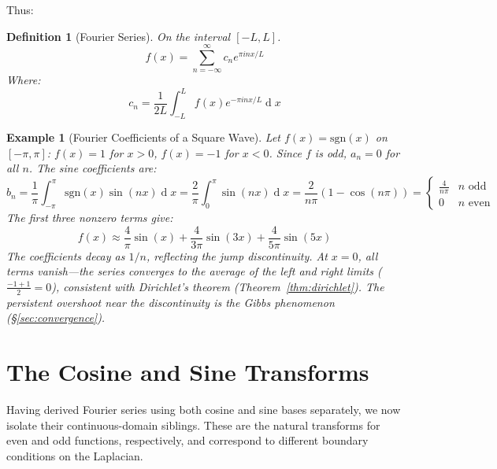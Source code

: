 \documentclass[12pt,a4paper]{report}
\DeclareMathOperator{\deriv}{d}
\theoremstyle{thms}
\theoremstyle{defns}
\newtheorem{definition}{Definition}[section]
\newtheorem{example}{Example}[section]
\begin{document}
Thus:
\begin{definition}[Fourier Series]
    On the interval $[-L, L]$.
    \begin{equation}
        f(x) = \sum_{n=-\infty}^{\infty} c_ne^{\pi inx/L}
    \end{equation}
    Where:
    \begin{equation}
        c_n = \dfrac{1}{2L}\int_{-L}^{L} f(x)e^{-\pi inx/L}\deriv{x}
    \end{equation}
\end{definition}

\begin{example}[Fourier Coefficients of a Square Wave]
    Let $f(x) = \mathrm{sgn}(x)$ on $[-\pi, \pi]$: $f(x) = 1$ for $x > 0$, $f(x) = -1$ for $x < 0$. Since $f$ is odd, $a_n = 0$ for all $n$. The sine coefficients are:
    \begin{equation}
        b_n = \dfrac{1}{\pi}\int_{-\pi}^{\pi} \mathrm{sgn}(x)\sin(nx)\deriv{x} = \dfrac{2}{\pi}\int_{0}^{\pi}\sin(nx)\deriv{x} = \dfrac{2}{n\pi}(1 - \cos(n\pi)) = \begin{cases} \frac{4}{n\pi} & n \text{ odd} \\ 0 & n \text{ even} \end{cases}
    \end{equation}
    The first three nonzero terms give:
    \begin{equation}
        f(x) \approx \dfrac{4}{\pi}\sin(x) + \dfrac{4}{3\pi}\sin(3x) + \dfrac{4}{5\pi}\sin(5x)
    \end{equation}
    The coefficients decay as $1/n$, reflecting the jump discontinuity. At $x = 0$, all terms vanish—the series converges to the average of the left and right limits ($\frac{-1+1}{2} = 0$), consistent with Dirichlet's theorem (Theorem~\ref{thm:dirichlet}). The persistent overshoot near the discontinuity is the Gibbs phenomenon (\S\ref{sec:convergence}).
    \label{ex:square_wave}
\end{example}

\section{The Cosine and Sine Transforms}
\label{sec:cos_sin_transforms}

Having derived Fourier series using both cosine and sine bases separately, we now isolate their continuous-domain siblings. These are the natural transforms for even and odd functions, respectively, and correspond to different boundary conditions on the Laplacian.
\end{document}

